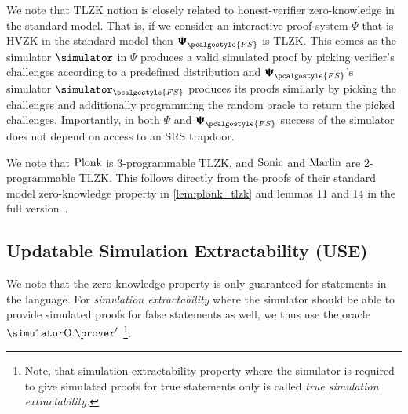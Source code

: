 \documentclass[10pt]{llncs}
\newcommand{\simO}{\simulator\oracleo}
\newcommand{\simOH}{\simO.\ro}
\newcommand{\simOP}{\simO.\prover}
\newcommand{\pcvarstyle}[1]{\mathsf{#1}}
\newcommand{\oracleo}{\mathsf{O}}
\newcommand{\srs}{\pcvarstyle{srs}}
\newcommand{\proofsystem}{\pcschemestyle{\Psi}}
\newcommand{\ro}{\mathcal{H}}
\newcommand{\fs}{\pcalgostyle{FS}}
\newcommand{\pcschemestyle}[1]{\bm{\mathsf{#1}}}
\newcommand{\inp}{\pcvarstyle{x}}
\newcommand{\plonk}{\ensuremath{\textnormal{{Plonk}}}}
\newcommand{\marlin}{{\ensuremath{\textnormal{{Marlin}}}}}
\newcommand{\sonic}{{\ensuremath{\textnormal{{Sonic}}}}}
\begin{document}
\begin{remark}
	We note that TLZK notion is closely related to honest-verifier zero-knowledge in the
	standard model. That is, if we consider an interactive proof system $\proofsystem$
	that is HVZK in the standard model then $\proofsystem_\fs$ is TLZK. This comes as the simulator $\simulator$ in
	$\proofsystem$ produces a valid simulated proof by picking verifier's challenges
	according to a predefined distribution and $\proofsystem_\fs$'s simulator
	$\simulator_\fs$ produces its proofs similarly by picking the challenges and
	additionally programming the random oracle to return the picked
	challenges. Importantly, in both $\proofsystem$ and $\proofsystem_\fs$ success of
	the simulator does not depend on access to an SRS trapdoor.
\end{remark}

We note that $\plonk$ is $3$-programmable TLZK, and $\sonic$ and $\marlin$ are $2$-programmable TLZK. This follows directly from the proofs of
their standard model zero-knowledge property in
\cref{lem:plonk_tlzk} and lemmas 11 and 14 in the full version~\cite{EPRINT:GKKNZ21}.

\subsection{Updatable Simulation Extractability (USE)}
We note that the zero-knowledge property is only guaranteed for statements in the
language.
For \emph{simulation extractability} where the simulator
should be able to provide simulated proofs for false statements as well, we thus use the oracle $\simOP'$
\footnote{Note,
	that simulation extractability property where the simulator is required to give
	simulated proofs for true statements only is called \emph{true simulation
		extractability.}}. 

%
\end{document}

